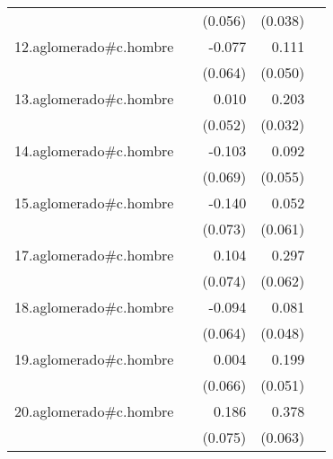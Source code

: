{\begin{longtable}{l*{4}{D{.}{.}{-1}}}
            &                     &     (0.056)         &     (0.038)         &                     \\
\addlinespace
12.aglomerado#c.hombre&                     &      -0.077         &       0.111\sym{*}  &                     \\
            &                     &     (0.064)         &     (0.050)         &                     \\
\addlinespace
13.aglomerado#c.hombre&                     &       0.010         &       0.203\sym{***}&                     \\
            &                     &     (0.052)         &     (0.032)         &                     \\
\addlinespace
14.aglomerado#c.hombre&                     &      -0.103         &       0.092         &                     \\
            &                     &     (0.069)         &     (0.055)         &                     \\
\addlinespace
15.aglomerado#c.hombre&                     &      -0.140         &       0.052         &                     \\
            &                     &     (0.073)         &     (0.061)         &                     \\
\addlinespace
17.aglomerado#c.hombre&                     &       0.104         &       0.297\sym{***}&                     \\
            &                     &     (0.074)         &     (0.062)         &                     \\
\addlinespace
18.aglomerado#c.hombre&                     &      -0.094         &       0.081         &                     \\
            &                     &     (0.064)         &     (0.048)         &                     \\
\addlinespace
19.aglomerado#c.hombre&                     &       0.004         &       0.199\sym{***}&                     \\
            &                     &     (0.066)         &     (0.051)         &                     \\
\addlinespace
20.aglomerado#c.hombre&                     &       0.186\sym{*}  &       0.378\sym{***}&                     \\
            &                     &     (0.075)         &     (0.063)         &                     \\

\end{longtable}}
